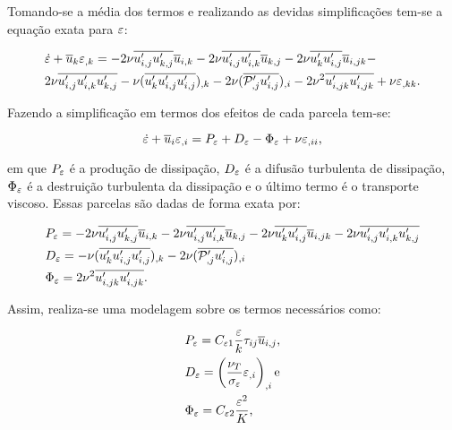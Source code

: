 Tomando-se a média dos termos e realizando as devidas simplificações tem-se a equação exata para $\varepsilon$:

\begin{equation}
    \begin{split}
        &\dot{\varepsilon}+\overline{u}_k\varepsilon_{,k}=-2\nu\overline{u'_{i,j}u'_{k,j}}\overline{u}_{i,k}-2\nu\overline{u'_{i,j}u'_{i,k}}\overline{u}_{k,j}-2\nu\overline{u'_ku'_{i,j}}\overline{u}_{i,jk}-\\
        &2\nu\overline{u'_{i,j}u'_{i,k}u'_{k,j}}-\nu(\overline{u'_ku'_{i,j}u'_{i,j}})_{,k}-2\nu(\overline{\mathcal{P}'_{,j}u'_{i,j}})_{,i}-2\nu^2\overline{u'_{i,jk}u'_{i,jk}}+\nu\varepsilon_{,kk}\text{.}
    \end{split}
\end{equation}

Fazendo a simplificação em termos dos efeitos de cada parcela tem-se:

\begin{equation}
    \dot{\varepsilon}+\overline{u}_i\varepsilon_{,i}=P_\varepsilon+D_\varepsilon-\Phi_\varepsilon+\nu\varepsilon_{,ii}\text{,}
\end{equation}

\noindent em que $P_\varepsilon$ é a produção de dissipação, $D_\varepsilon$ é a difusão turbulenta de dissipação, $\Phi_\varepsilon$ é a destruição turbulenta da dissipação e o último termo é o transporte viscoso. Essas parcelas são dadas de forma exata por:

\begin{subequations}
    \begin{align}
         & P_\varepsilon=-2\nu\overline{u'_{i,j}u'_{k,j}}\overline{u}_{i,k}-2\nu\overline{u'_{i,j}u'_{i,k}}\overline{u}_{k,j}-2\nu\overline{u'_ku'_{i,j}}\overline{u}_{i,jk}-2\nu\overline{u'_{i,j}u'_{i,k}u'_{k,j}} \\
         & D_\varepsilon=-\nu(\overline{u'_ku'_{i,j}u'_{i,j}})_{,k}-2\nu(\overline{\mathcal{P}'_{,j}u'_{i,j}})_{,i}                                                                                 \\
         & \Phi_\varepsilon=2\nu^2\overline{u'_{i,jk}u'_{i,jk}}\text{.}
    \end{align}
\end{subequations}

Assim, realiza-se uma modelagem sobre os termos necessários como:

\begin{subequations}
    \begin{align}
         & P_\varepsilon=C_{\varepsilon 1}\frac{\varepsilon}{k}\tau_{ij}\overline{u}_{i,j}\text{,}   \\
         & D_\varepsilon=\left({\frac{\nu_T}{\sigma_\varepsilon}\varepsilon_{,i}}\right)_{,i}\text{e} \\
         & \Phi_\varepsilon=C_{\varepsilon 2}\frac{\varepsilon^2}{K}\text{,}
    \end{align}
\end{subequations}

